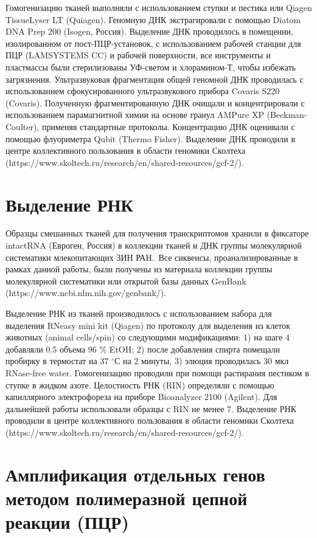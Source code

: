 Гомогенизацию тканей выполняли с использованием ступки и пестика или Qiagen TissueLyser LT (Quiagen). Геномную ДНК экстрагировали с помощью Diatom DNA Prep 200 (Isogen, Россия). Выделение ДНК проводилось в помещении, изолированном от пост-ПЦР-установок, с использованием рабочей станции для ПЦР (LAMSYSTEMS CC) и рабочей поверхности, все инструменты и пластмассы были стерилизованы УФ-светом и хлорамином-Т, чтобы избежать загрязнения. Ультразвуковая фрагментация общей геномной ДНК проводилась с использованием сфокусированного ультразвукового прибора Covaris S220 (Covaris). Полученную фрагментированную ДНК очищали и концентрировали с использованием парамагнитной химии на основе гранул AMPure XP (Beckman-Coulter), применяя стандартные протоколы. Концентрацию ДНК оценивали с помощью флуориметра Qubit (Thermo Fisher). Выделение ДНК проводили в центре коллективного пользования в области геномики Сколтеха (https://www.skoltech.ru/research/en/shared-resources/gcf-2/). 

\section{Выделение РНК}

Образцы смешанных тканей для получения транскриптомов хранили в фиксаторе intactRNA (Евроген, Россия) в коллекции тканей и ДНК группы молекулярной систематики млекопитающих ЗИН РАН. Все сиквенсы, проанализированные в рамках данной работы, были получены из материала коллекции группы молекулярной систематики или открытой базы данных GenBank (https://www.ncbi.nlm.nih.gov/genbank/).

Выделение РНК из тканей производилось с использованием набора для выделения RNeasy mini kit (Qiagen) по протоколу для выделения из клеток животных (animal cells/spin) со следующими модификациями: 1) на шаге 4 добавляли 0.5 объема 96 \% EtOH; 2) после добавления спирта помещали пробирку в термостат на 37 $^\circ$С на 2 минуты, 3) элюция проводилась 30 мкл RNase-free water. Гомогенизацию проводили при помощи растирания пестиком в ступке в жидком азоте. Целостность РНК (RIN) определяли с помощью капиллярного электрофореза на приборе Bioanalyzer 2100 (Agilent). Для дальнейшей работы использовали образцы с RIN не менее 7. Выделение РНК проводили в центре коллективного пользования в области геномики Сколтеха (https://www.skoltech.ru/research/en/shared-resources/gcf-2/).

\section{Амплификация отдельных генов методом полимеразной цепной реакции (ПЦР)}

